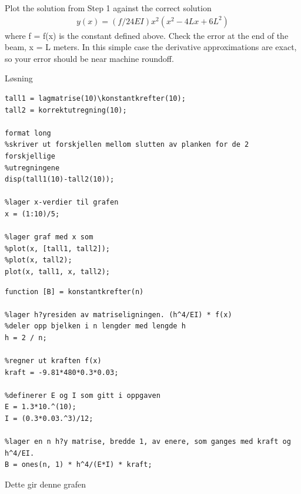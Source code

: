 % 

Plot the solution from Step 1 against the correct solution
\begin{align}
	y(x) = (f/24EI)x^2(x^2 − 4Lx + 6L^2)
\end{align}
where f = f(x) is the constant defined above.
\newline
\newline
Check the error at the end of the beam, x = L meters. In this simple case the derivative approximations are exact, so your error should be near machine roundoff.


\vspace{5mm}
Løsning

\begin{lstlisting}[caption={oppgave2.m}]
%definerer steglengden
tall1 = lagmatrise(10)\konstantkrefter(10);
tall2 = korrektutregning(10);

format long
%skriver ut forskjellen mellom slutten av planken for de 2 forskjellige
%utregningene
disp(tall1(10)-tall2(10));

%lager x-verdier til grafen
x = (1:10)/5;

%lager graf med x som 
%plot(x, [tall1, tall2]);
%plot(x, tall2); 
plot(x, tall1, x, tall2); 
\end{lstlisting}


\begin{lstlisting}[caption={konstantkrefter.m}]
function [B] = konstantkrefter(n)

%lager h?yresiden av matriseligningen. (h^4/EI) * f(x) 
%deler opp bjelken i n lengder med lengde h 
h = 2 / n;        

%regner ut kraften f(x) 
kraft = -9.81*480*0.3*0.03; 

%definerer E og I som gitt i oppgaven
E = 1.3*10.^(10); 
I = (0.3*0.03.^3)/12; 

%lager en n h?y matrise, bredde 1, av enere, som ganges med kraft og h^4/EI.
B = ones(n, 1) * h^4/(E*I) * kraft;

\end{lstlisting}

\vspace{3mm}
\noindent Dette gir denne grafen\\


